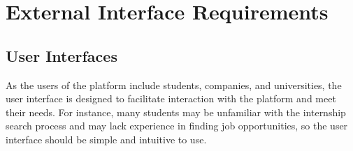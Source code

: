 \renewcommand{\thesection}{\Alph{section}}
\section{External Interface Requirements}
\subsection{User Interfaces}\label{sec:UserInterfaces}
As the users of the platform include students, companies, and universities, the user interface is designed to facilitate interaction with 
the platform and meet their needs. For instance, many students may be unfamiliar with the internship search process and may lack experience
in finding job opportunities, so the user interface should be simple and intuitive to use.

